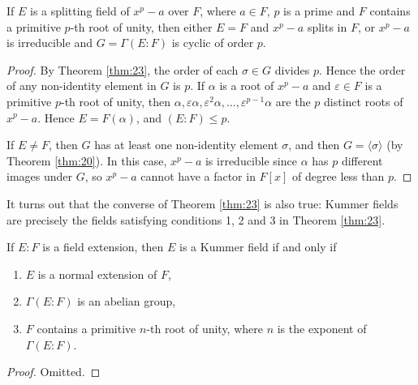 \begin{corollary}
	If $E$ is a splitting field of $x^p - a$ over $F$, where $a \in F$, $p$ is a prime and $F$ contains a primitive $p$-th root of unity, then either $E = F$ and $x^p - a$ splits in $F$, or $x^p - a$ is irreducible and $G = \Gamma(E : F)$ is cyclic of order $p$.
	\begin{proof}
		By Theorem \ref{thm:23}, the order of each $\sigma \in G$ divides $p$. Hence the order of any non-identity element in $G$ is $p$. If $\alpha$ is a root of $x^p - a$ and $\varepsilon \in F$ is a primitive $p$-th root of unity, then $\alpha, \varepsilon\alpha, \varepsilon^2 \alpha, \dots, \varepsilon^{p - 1} \alpha$ are the $p$ distinct roots of $x^p - a$. Hence $E = F(\alpha)$, and $(E : F) \leq p$.
		
		If $E \neq F$, then $G$ has at least one non-identity element $\sigma$, and then $G = \langle \sigma \rangle$ (by Theorem \ref{thm:20}). In this case, $x^p - a$ is irreducible since $\alpha$ has $p$ different images under $G$, so $x^p - a$ cannot have a factor in $F[x]$ of degree less than $p$.
	\end{proof}
\end{corollary}

It turns out that the converse of Theorem \ref{thm:23} is also true: Kummer fields are precisely the fields satisfying conditions 1, 2 and 3 in Theorem \ref{thm:23}.

\begin{theorem}
	If $E : F$ is a field extension, then $E$ is a Kummer field if and only if
	\begin{enumerate}
		\item $E$ is a normal extension of $F$,
		\item $\Gamma(E : F)$ is an abelian group,
		\item $F$ contains a primitive $n$-th root of unity, where $n$ is the exponent of $\Gamma(E : F)$.
	\end{enumerate}
	\begin{proof}
		Omitted.
	\end{proof}
\end{theorem}
